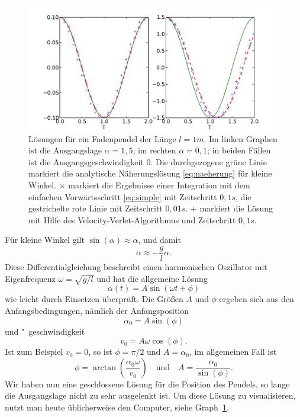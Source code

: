 \begin{figure}
  \centering
  \includegraphics[width=\textwidth]{plots/pendel_loesung}
  \caption{Lösungen für ein Fadenpendel der Länge $l=1m$. Im linken Graphen
    ist die Ausgangslage $\alpha=1,5$, im rechten $\alpha=0,1$; in
    beiden Fällen ist die Ausgangsgeschwindigkeit 0. Die durchgezogene
  grüne Linie markiert die analytische Näherungslösung
  \eqref{eq:naeherung} für kleine Winkel. $\times$ markiert die
  Ergebnisse einer Integration mit dem einfachen Vorwärtsschritt
  \eqref{eq:simple} mit Zeitschritt $0,1s$, die gestrichelte rote
  Linie mit Zeitschritt $0,01s$. $+$ markiert die Lösung mit Hilfe des
  Velocity-Verlet-Algorithmus und Zeitschritt $0,1s$.}
  \label{fig:loesung}
\end{figure}

Für kleine Winkel gilt $\sin(\alpha)\approx\alpha$, und damit
\begin{equation}
  \label{eq:harmosz}
  \ddot\alpha \approx -\frac{g}{l}\alpha.
\end{equation}
Diese Differentialgleichung beschreibt einen harmonischen Oszillator
mit Eigenfrequenz $\omega=\sqrt{g/l}$ und hat die allgemeine Lösung
\begin{equation}
  \alpha(t) = A \sin(\omega t + \phi)
  \label{eq:naeherung}
\end{equation}
wie leicht durch Einsetzen überprüft. Die Größen $A$ und $\phi$
ergeben sich aus den Anfangsbedingungen, nämlich der Anfangsposition
\begin{equation}
  \alpha_0 = A \sin(\phi)
\end{equation}
und "~geschwindigkeit
\begin{equation}
  v_0 = A \omega \cos(\phi).
\end{equation}
Ist zum Beispiel $v_0=0$, so ist $\phi=\pi/2$ und $A=\alpha_0$, im
allgemeinen Fall ist
\begin{equation}
\phi =
\arctan\left(\frac{\alpha_0\omega}{v_0}\right)\quad\text{und}\quad
A = \frac{\alpha_0}{\sin(\phi)}.
\end{equation}
Wir haben nun eine geschlossene Lösung für die Position des Pendels,
so lange die Ausgangslage nicht zu sehr ausgelenkt ist. Um diese
Lösung zu visualisieren, nutzt man heute üblicherweise den Computer,
siehe Graph~\ref{fig:loesung}.

